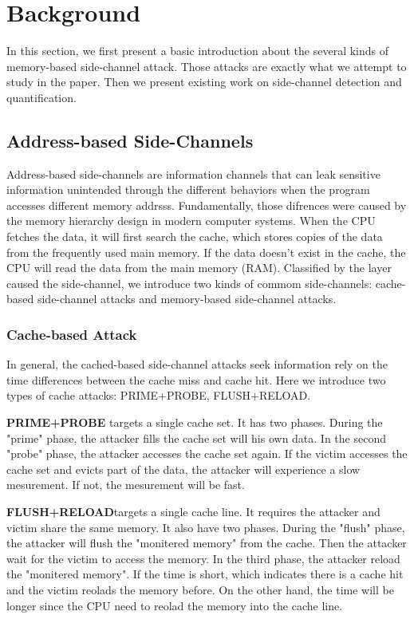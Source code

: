\section{Background}
In this section, we first present a basic introduction about the 
several kinds of memory-based side-channel attack. Those attacks 
are exactly what we attempt to study in the paper. Then we present
existing work on side-channel detection and quantification.  
\subsection{Address-based Side-Channels}
Address-based side-channels are information channels that can leak sensitive information unintended
through the different behaviors when the program accesses different memory addrsss. Fundamentally,
those difrences were caused by the memory hierarchy design in modern computer systems. When the 
CPU fetches the data, it will first search the cache, which stores copies of the data from 
the frequently used main memory. If the data doesn't exist in the cache, the CPU will read
the data from the main memory (RAM). Classified by the layer caused the side-channel, we 
introduce two kinds of commom side-channels: cache-based side-channel attacks and memory-based
side-channel attacks.

\subsubsection{Cache-based Attack}
In general, the cached-based side-channel attacks seek information 
rely on the time differences between the cache miss
and cache hit. Here we introduce two types of cache attacks:
PRIME+PROBE, FLUSH+RELOAD.

\textbf{PRIME+PROBE} targets a single cache set. It has two phases. During the
"prime" phase, the attacker fills the cache set will his own data.
In the second "probe" phase, the attacker accesses the cache set
again. If the victim accesses the cache set and evicts part of 
the data, the attacker will experience a slow mesurement. If not, 
the mesurement will be fast.

\textbf{FLUSH+RELOAD}targets a single cache line. 
It requires the attacker and victim share the same memory.
It also have two phases. During the "flush" phase, the attacker 
will flush the "monitered memory" from the cache. Then the attacker
wait for the victim to access the memory. In the third phase, the 
attacker reload the "monitered memory". If the time is short, which
indicates there is a cache hit and the victim reolads the memory before. 
On the other hand, the time will be longer since the CPU need to reolad
the memory into the cache line. 

